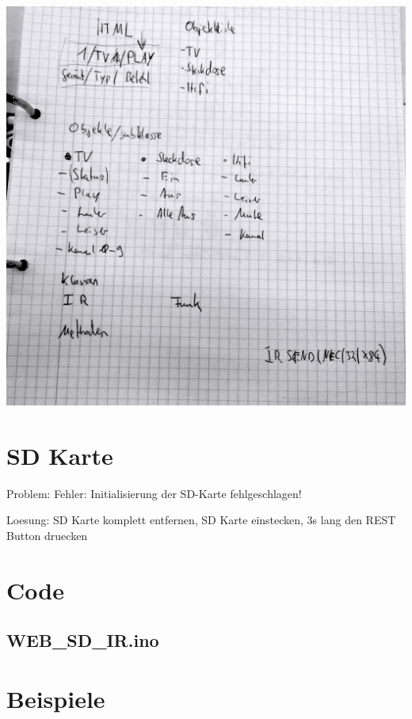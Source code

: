 \documentclass[10pt]{article}
\newcommand{\mylisting}[2][]{%
}
\begin{document}
\includegraphics[width=\textwidth]{images/Stuktur-Sketch.jpg}





\section{SD Karte}

Problem: Fehler: Initialisierung der SD-Karte fehlgeschlagen!

Loesung: SD Karte komplett entfernen, SD Karte einstecken, 3s lang den REST Button druecken


\section{Code}
\subsection{WEB\_SD\_IR.ino}
	\mylisting[language=C]{../code/WEB_SD_IR/WEB_SD_IR.ino}
\newpage
\section{Beispiele}
\end{document}
